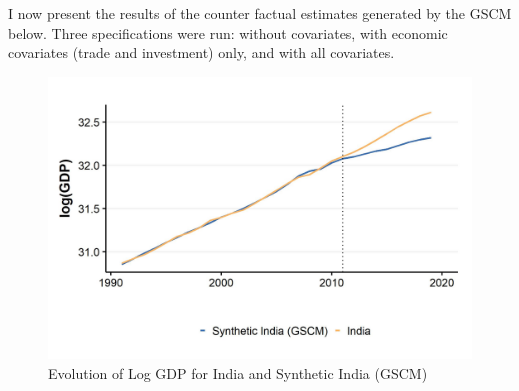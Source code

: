 \documentclass[12pt,nobind, a4paper]{reedthesis}
\begin{document}
 I now present the results of the counter factual estimates generated by the GSCM below. Three specifications were run: without covariates, with economic covariates (trade and investment) only, and with all covariates.
 \begin{figure}

 {\centering \includegraphics[width=1\linewidth]{figure/indiagsynth} 

 }

 \caption{Evolution of Log GDP for India and Synthetic India (GSCM)}\label{fig:indgsyn}
 \end{figure}
 \newpage
\end{document}
